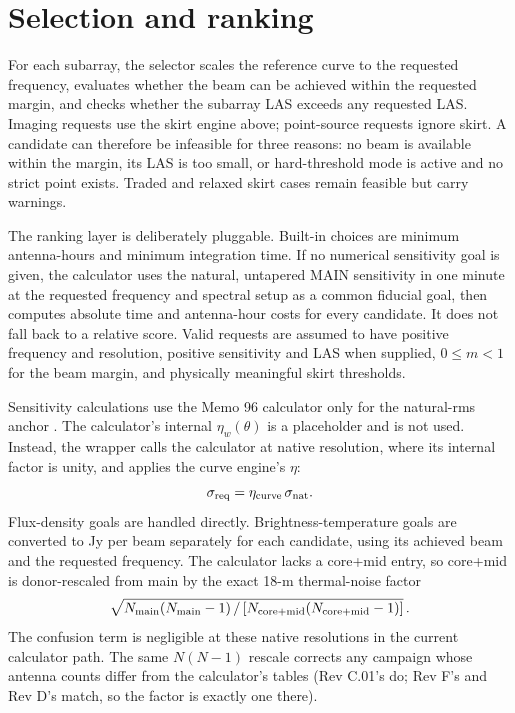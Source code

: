 \documentclass[11pt]{article}
\begin{document}
\section{Selection and ranking}

For each subarray, the selector scales the reference curve to the requested
frequency, evaluates whether the beam can be achieved within the requested
margin, and checks whether the subarray LAS exceeds any requested LAS.  Imaging
requests use the skirt engine above; point-source requests ignore skirt.  A
candidate can therefore be infeasible for three reasons: no beam is
available within the margin, its LAS is too small, or hard-threshold mode
is active and no strict point exists.  Traded and relaxed skirt cases remain
feasible but carry warnings.

The ranking layer is deliberately pluggable.  Built-in choices are minimum
antenna-hours and minimum integration time.  If no numerical sensitivity goal
is given, the calculator uses the natural, untapered MAIN sensitivity in one
minute at the requested frequency and spectral setup as a common fiducial
goal, then computes absolute time and antenna-hour costs for every candidate.
It does not fall back to a relative score.  Valid requests are assumed to have
positive frequency and resolution, positive sensitivity and LAS when supplied,
$0\le m<1$ for the beam margin, and physically meaningful skirt thresholds.

Sensitivity calculations use the Memo 96 calculator only for the natural-rms
anchor \cite{memo96}.  The calculator's internal $\eta_w(\theta)$ is a
placeholder and is not used.  Instead, the wrapper calls the calculator at
native resolution, where its internal factor is unity, and applies the curve
engine's $\eta$:
\begin{equation}
  \sigma_{\rm req} = \eta_{\rm curve}\,\sigma_{\rm nat}.
\end{equation}
Flux-density goals are handled directly.  Brightness-temperature goals are
converted to Jy per beam separately for each candidate, using its achieved
beam and the requested frequency.  The
calculator lacks a core+mid entry, so core+mid is donor-rescaled from main by
the exact 18-m thermal-noise factor
\[
\sqrt{N_{\rm main}(N_{\rm main}-1)\,/\,
      [N_{\rm core+mid}(N_{\rm core+mid}-1)]}\,.
\]
The confusion term is negligible at these native resolutions in the current
calculator path.  The same $N(N-1)$ rescale corrects any campaign whose
antenna counts differ from the calculator's tables (Rev C.01's do; Rev F's
and Rev D's match, so the factor is exactly one there).
\end{document}
